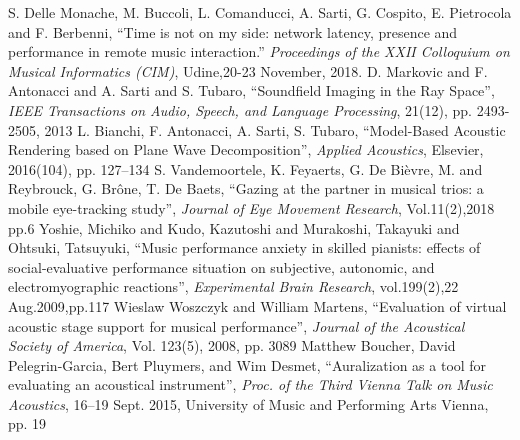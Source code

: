 \documentclass[conference]{IEEEtran}
\begin{document}
\begin{thebibliography}{6}
S. Delle Monache, M. Buccoli, L. Comanducci, A. Sarti, G. Cospito, E. Pietrocola and F. Berbenni, ``Time is not on my side: network latency, presence and performance in remote music interaction.'' \emph{Proceedings of the XXII Colloquium on Musical Informatics (CIM)}, Udine,20-23 November, 2018.
%
D. Markovic and F. Antonacci and A. Sarti and S. Tubaro, ``Soundfield Imaging in the Ray Space'',
\emph{IEEE Transactions on Audio, Speech, and Language Processing}, 
21(12), 
pp. 2493-2505, 2013
%
L. Bianchi, F. Antonacci, A. Sarti, S. Tubaro,
``Model-Based Acoustic Rendering based on Plane Wave Decomposition'',
\emph{Applied Acoustics},
Elsevier,
2016(104),
pp. 127--134
S. Vandemoortele, K. Feyaerts, G. De Bi{\`e}vre, M. and Reybrouck, G. Br{\^o}ne, T. De Baets,
``Gazing at the partner in musical trios: a mobile eye-tracking study'',
\emph{Journal of Eye Movement Research}, 
Vol.11(2),2018
pp.6
Yoshie, Michiko
and Kudo, Kazutoshi
and Murakoshi, Takayuki
and Ohtsuki, Tatsuyuki, ``Music performance anxiety in skilled pianists: effects of social-evaluative performance situation on subjective, autonomic, and electromyographic reactions'',
\emph{Experimental Brain Research},
vol.199(2),22 Aug.2009,pp.117
%
Wieslaw Woszczyk and William Martens, ``Evaluation of virtual acoustic stage support for musical performance'', \emph{Journal of the Acoustical Society of America}, Vol. 123(5), 2008, pp. 3089
%
Matthew Boucher, David Pelegrin-Garcia, Bert Pluymers, and Wim Desmet, ``Auralization as a tool for evaluating an acoustical instrument'', \emph{Proc. of the Third Vienna Talk on Music Acoustics}, 16–19 Sept. 2015, University of Music and Performing Arts Vienna, pp. 19
%	
%	
%	
%	
%	
%	
%	

\end{thebibliography}
\end{document}
